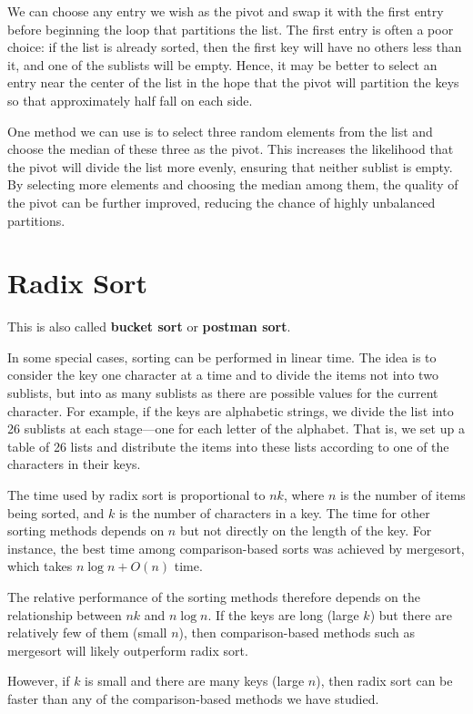 We can choose any entry we wish as the pivot and swap it with the first entry before beginning the loop that partitions the list. The first entry is often a poor choice: if the list is already sorted, then the first key will have no others less than it, and one of the sublists will be empty. Hence, it may be better to select an entry near the center of the list in the hope that the pivot will partition the keys so that approximately half fall on each side.

One method we can use is to select three random elements from the list and choose the median of these three as the pivot. This increases the likelihood that the pivot will divide the list more evenly, ensuring that neither sublist is empty. By selecting more elements and choosing the median among them, the quality of the pivot can be further improved, reducing the chance of highly unbalanced partitions.

\section{Radix Sort}
This is also called \textbf{bucket sort} or \textbf{postman sort}.

In some special cases, sorting can be performed in linear time. The idea is to consider the key one character at a time and to divide the items not into two sublists, but into as many sublists as there are possible values for the current character. For example, if the keys are alphabetic strings, we divide the list into 26 sublists at each stage—one for each letter of the alphabet. That is, we set up a table of 26 lists and distribute the items into these lists according to one of the characters in their keys.

The time used by radix sort is proportional to \(nk\), where \(n\) is the number of items being sorted, and \(k\) is the number of characters in a key. The time for other sorting methods depends on \(n\) but not directly on the length of the key. For instance, the best time among comparison-based sorts was achieved by mergesort, which takes \(n \log n + O(n)\) time.

The relative performance of the sorting methods therefore depends on the relationship between \(nk\) and \(n \log n\). If the keys are long (large \(k\)) but there are relatively few of them (small \(n\)), then comparison-based methods such as mergesort will likely outperform radix sort.

However, if \(k\) is small and there are many keys (large \(n\)), then radix sort can be faster than any of the comparison-based methods we have studied.

